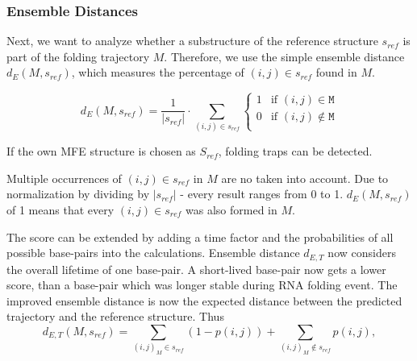 \documentclass[ twoside,openright,titlepage,numbers=noenddot,headinclude,%
                footinclude=false, cleardoublepage=empty,abstractoff, %
                BCOR=5mm,paper=a4,fontsize=11pt,%
                ngerman,american,%
                ]{scrreprt}
\begin{document}
\subsubsection{Ensemble Distances \cite{EnsembleDistance}}
Next, we want to analyze whether a substructure
of the reference structure $s_{ref}$ is part of the folding trajectory $M$.
Therefore, we use the simple ensemble distance $d_E(M,s_{ref})$, which measures
the percentage of $(i,j) \in s_{ref}$ found in $M$.

\begin{equation}
d_E(M,s_{ref}) = \frac{1}{|s_{ref}|} \cdot \sum\limits_{(i,j) \in s_{ref}}
\begin{cases} 
1 & \mbox{if }(i,j) \in \texttt{M} \\ 
0 & \mbox{if }(i,j) \notin \texttt{M} \\
\end{cases}
\label{eq:SimpleEnsembleDistance}			
\end{equation}




If the own MFE structure is chosen as $S_{ref}$, folding traps can be detected.

Multiple occurrences of $(i,j)\in s_{ref}$ in $M$ are no taken into account.
Due to normalization by dividing by $|s_{ref}|$ - every result ranges from
0 to 1.
$d_E(M,s_{ref})$ of 1 means that every $(i,j) \in s_{ref}$ was also formed in $M$.


The score can be extended by adding a time factor and the probabilities of all possible base-pairs into the
calculations. Ensemble distance $d_{E,T}$ now considers the overall lifetime of one
base-pair. A short-lived base-pair now gets a lower score, than a base-pair
which was longer stable during RNA folding event. The improved ensemble distance is now the expected distance between the predicted trajectory and the reference structure\cite{EnsembleDistance}.
Thus
\begin{equation}
d_{E,T}(M,s_{ref})= \sum\limits_{(i,j)_M \in s_{ref} } (1- p(i,j)) + \sum\limits_{(i,j)_M \notin s_{ref}} p(i,j),
\label{eq:ensemble distance}
\end{equation}
\end{document}
